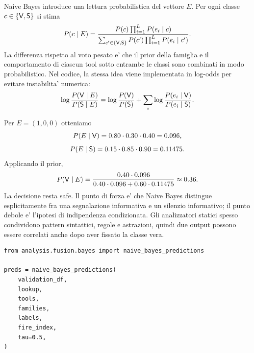 Naive Bayes introduce una lettura probabilistica del vettore $E$. Per ogni classe $c\in\{\mathsf{V},\mathsf{S}\}$ si stima
\begin{equation}
P(c\mid E)=
\frac{P(c)\prod_{i=1}^{L}P(e_i\mid c)}
{\sum_{c'\in\{\mathsf{V},\mathsf{S}\}}P(c')\prod_{i=1}^{L}P(e_i\mid c')}.
\end{equation}
La differenza rispetto al voto pesato e' che il prior della famiglia e il comportamento di ciascun tool sotto entrambe le classi sono combinati in modo probabilistico. Nel codice, la stessa idea viene implementata in log-odds per evitare instabilita' numerica:
\begin{equation}
\log\frac{P(\mathsf{V}\mid E)}{P(\mathsf{S}\mid E)}
=
\log\frac{P(\mathsf{V})}{P(\mathsf{S})}
+
\sum_i \log\frac{P(e_i\mid\mathsf{V})}{P(e_i\mid\mathsf{S})}.
\end{equation}

Per $E=(1,0,0)$ otteniamo
\begin{equation}
P(E\mid\mathsf{V})=0.80\cdot 0.30\cdot 0.40=0.096,
\end{equation}
\begin{equation}
P(E\mid\mathsf{S})=0.15\cdot 0.85\cdot 0.90=0.11475.
\end{equation}
Applicando il prior,
\begin{equation}
P(\mathsf{V}\mid E)=
\frac{0.40\cdot 0.096}{0.40\cdot 0.096 + 0.60\cdot 0.11475}
\approx 0.36.
\end{equation}
La decisione resta safe. Il punto di forza e' che Naive Bayes distingue esplicitamente fra una segnalazione informativa e un silenzio informativo; il punto debole e' l'ipotesi di indipendenza condizionata. Gli analizzatori statici spesso condividono pattern sintattici, regole e astrazioni, quindi due output possono essere correlati anche dopo aver fissato la classe vera.

\begin{lstlisting}[caption={Implementazione Naive Bayes in analysis/fusion/bayes.py}]
from analysis.fusion.bayes import naive_bayes_predictions

preds = naive_bayes_predictions(
    validation_df,
    lookup,
    tools,
    families,
    labels,
    fire_index,
    tau=0.5,
)
\end{lstlisting}
